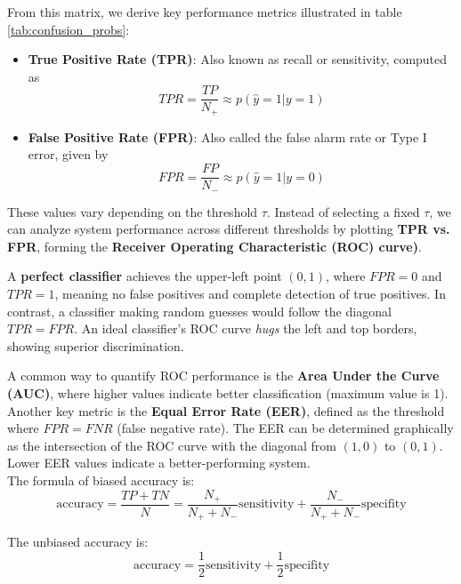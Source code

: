 \documentclass[12pt, a4paper]{article}
\theoremstyle{definition}
\numberwithin{figure}{section}
\numberwithin{equation}{section}
\numberwithin{table}{section}
\begin{document}
From this matrix, we derive key performance metrics illustrated in table \ref{tab:confusion_probs}:
\begin{itemize}
    \item \textbf{True Positive Rate (TPR)}: Also known as recall or sensitivity, computed as  
    \begin{equation}
    TPR = \frac{TP}{N_+} \approx p(\hat{y} = 1 | y = 1)
    \end{equation}
    \item \textbf{False Positive Rate (FPR)}: Also called the false alarm rate or Type I error, given by  
    \begin{equation}
    FPR = \frac{FP}{N_-} \approx p(\hat{y} = 1 | y = 0)
    \end{equation}
\end{itemize}

These values vary depending on the threshold $\tau$. Instead of selecting a fixed $\tau$, we can analyze system performance across different thresholds by plotting \textbf{TPR vs. FPR}, forming the \textbf{Receiver Operating Characteristic (ROC) curve)}.  

A \textbf{perfect classifier} achieves the upper-left point $(0,1)$, where $FPR = 0$ and $TPR = 1$, meaning no false positives and complete detection of true positives. In contrast, a classifier making random guesses would follow the diagonal $TPR = FPR$. An ideal classifier’s ROC curve \emph{hugs} the left and top borders, showing superior discrimination.  

A common way to quantify ROC performance is the \textbf{Area Under the Curve (AUC)}, where higher values indicate better classification (maximum value is 1). Another key metric is the \textbf{Equal Error Rate (EER)}, defined as the threshold where $FPR = FNR$ (false negative rate). The EER can be determined graphically as the intersection of the ROC curve with the diagonal from $(1,0)$ to $(0,1)$. Lower EER values indicate a better-performing system.\\

The formula of biased accuracy is:
\begin{equation}
    \text{accuracy}=\frac{TP+TN}{N}=\frac{N_+}{N_+ + N_-}\text{sensitivity} + \frac{N_-}{N_+ + N_-}\text{specifity}
\end{equation}

The unbiased accuracy is:
\begin{equation}
    \text{accuracy}=\frac{1}{2}\text{sensitivity} + \frac{1}{2}\text{specifity}
\end{equation}
\end{document}
